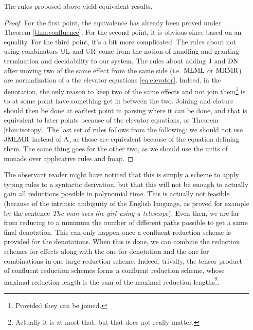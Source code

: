 \begin{thm}
	The rules proposed above yield equivalent results.
\end{thm}
\begin{proof}
	For the first point, the equivalence has already been proved under Theorem
	\ref{thm:confluence}.
	For the second point, it is obvious since based on an equality.
	For the third point, it's a bit more complicated.
	The rules about not using combinators $\text{UL}$ and $\text{UR}$ come from the
	notion of handling and granting termination and decidability to our system.
	The rules about adding $\text{J}$ and $\text{DN}$ after moving two of the same
	effect from the same side (i.e. $\text{ML} \text{ML}$ or $\text{MR}\text{MR}$) are
	normalization of a the elevator equations \ref{eq:elevator}.
	Indeed, in the denotation, the only reason to keep two of the same effects
	and not join them\footnote{Provided they can be joined.} is to at some point
	have something get in between the two.
	Joining and cloture should then be done at earliest point in parsing where it
	can be done, and that is equivalent to later points because of the elevator
	equations, or Theorem \ref{thm:isotopy}.
	The last set of rules follows from the following: we should not use $\text{J}
		\text{ML} \text{MR}$ instead of $\text{A}$, as those are equivalent because of the
	equation defining them.
	The same thing goes for the other two, as we should use the units of monads
	over applicative rules and fmap.
\end{proof}

\medskip

The observant reader might have noticed that this is simply a scheme to apply
typing rules to a syntactic derivation, but that this will not be enough to
actually gain all reductions possible in polynomial time.
This is actually not feasible (because of the intrinsic ambiguity of the
English language, as proved for example by the sentence \emph{The man sees the
	girl using a telescope}).
Even then, we are far from reducing to a minimum the number of different paths
possible to get a same final denotation.
This can only happen once a confluent reduction scheme is provided for the
denotations.
When this is done, we can combine the reduction schemes for effects along with
the one for denotation and the one for combinations in one large reduction
scheme.
Indeed, trivally, the tensor product of confluent reduction schemes forms a
confluent reduction scheme, whose maximal reduction length is the sum of the
maximal reduction lengths\footnote{Actually it is at most that, but that does
	not	really matter.}.

